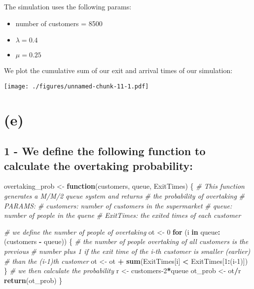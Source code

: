 \documentclass[]{article}
\newenvironment{Shaded}{\begin{snugshade}}{\end{snugshade}}
\newcommand{\CommentTok}[1]{\textcolor[rgb]{0.56,0.35,0.01}{\textit{#1}}}
\newcommand{\ControlFlowTok}[1]{\textcolor[rgb]{0.13,0.29,0.53}{\textbf{#1}}}
\newcommand{\DecValTok}[1]{\textcolor[rgb]{0.00,0.00,0.81}{#1}}
\newcommand{\KeywordTok}[1]{\textcolor[rgb]{0.13,0.29,0.53}{\textbf{#1}}}
\newcommand{\NormalTok}[1]{#1}
\newcommand{\OperatorTok}[1]{\textcolor[rgb]{0.81,0.36,0.00}{\textbf{#1}}}
\newcommand{\StringTok}[1]{\textcolor[rgb]{0.31,0.60,0.02}{#1}}
\providecommand{\tightlist}{%
  \setlength{\itemsep}{0pt}\setlength{\parskip}{0pt}}
\begin{document}
\newpage

The simulation uses the following params:

\begin{itemize}
\tightlist
\item
  number of customers = 8500
\item
  \(\lambda = 0.4\)
\item
  \(\mu = 0.25\)
\end{itemize}

We plot the cumulative sum of our exit and arrival times of our
simulation:

\texttt{[image: ./figures/unnamed-chunk-11-1.pdf]}

\newpage

\hypertarget{e}{%
\section{(e)}\label{e}}

\hypertarget{we-define-the-following-function-to-calculate-the-overtaking-probability}{%
\subsection{1 - We define the following function to calculate the
overtaking
probability:}\label{we-define-the-following-function-to-calculate-the-overtaking-probability}}

\begin{Shaded}
\begin{Highlighting}[]
\NormalTok{overtaking_prob <-}\StringTok{ }\ControlFlowTok{function}\NormalTok{(customers, queue, ExitTimes) \{}
  \CommentTok{# This function generates a M/M/2 queue system and returns }
  \CommentTok{# the probability of overtaking}
  \CommentTok{# PARAMS:}
  \CommentTok{# customers:   number of customers in the supermarket}
  \CommentTok{# queue:       number of people in the quene}
  \CommentTok{# ExitTimes:   the exited times of each customer}

  \CommentTok{# we define the number of people of overtaking}
\NormalTok{  ot <-}\StringTok{ }\DecValTok{0}
  \ControlFlowTok{for}\NormalTok{ (i }\ControlFlowTok{in}\NormalTok{ queue}\OperatorTok{:}\NormalTok{(customers }\OperatorTok{-}\StringTok{ }\NormalTok{queue)) \{}
    \CommentTok{# the number of people overtaking of all customers is the previous }
    \CommentTok{# number plus 1 if the exit time of the i-th customer is smaller (earlier) }
    \CommentTok{# than the (i-1)th customer }
\NormalTok{    ot <-}\StringTok{ }\NormalTok{ot }\OperatorTok{+}\StringTok{ }\KeywordTok{sum}\NormalTok{(ExitTimes[i] }\OperatorTok{<}\StringTok{ }\NormalTok{ExitTimes[}\DecValTok{1}\OperatorTok{:}\NormalTok{(i}\DecValTok{-1}\NormalTok{)])}
\NormalTok{  \}}
  \CommentTok{# we then calculate the probability}
\NormalTok{  r <-}\StringTok{ }\NormalTok{customers}\DecValTok{-2}\OperatorTok{*}\NormalTok{queue}
\NormalTok{  ot_prob <-}\StringTok{ }\NormalTok{ot}\OperatorTok{/}\NormalTok{r}
  \KeywordTok{return}\NormalTok{(ot_prob)}
\NormalTok{\}}
\end{Highlighting}
\end{Shaded}
\end{document}
